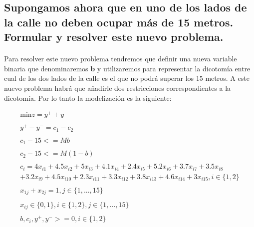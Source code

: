 \documentclass[10pt, a4paper]{article}
\begin{document}
		\subsection{Supongamos ahora que en uno de los lados de la calle no deben ocupar más de 15 metros. Formular y resolver este nuevo problema.}

			\paragraph{}
			Para resolver este nuevo problema tendremos que definir una nueva variable binaria que denominaremos \textbf{b} y utilizaremos para representar la dicotomía entre cual de los dos lados de la calle es el que no podrá superar los 15 metros. A este nuevo problema habrá que añadirle dos restricciones correspondientes a la dicotomía. Por lo tanto la modelización es la siguiente:

			\[
				\begin{split}
					\text{min} z = y^{+} + y^{-} \\ \\
						y^{+} - y^{-} = c_1 - c_2 \\ \\
						c_1 - 15 <= Mb \\ \\
						c_2 - 15 <= M(1-b) \\ \\
						c_i = 4x_{i1} + 4.5x_{i2} + 5x_{i3} + 4.1x_{i4} + 2.4x_{i5} + 5.2x_{i6} + 3.7x_{i7} + 3.5x_{i8} \\
						+ 3.2x_{i9} + 4.5x_{i10} + 2.3x_{i11} + 3.3x_{i12} + 3.8x_{i13} + 4.6x_{i14} + 3x_{i15}, i \in \{1,2\}\\ \\
						x_{1j} + x_{2j} = 1, j \in \{1,...,15\} \\ \\
						x_{ij} \in \{0,1\}, i \in \{1,2\},j \in \{1,...,15\} \\ \\
						b, c_{i}, y^{+}, y^{-} >= 0, i \in \{1,2\}\\ \\
				\end{split}
			\]
\end{document}

